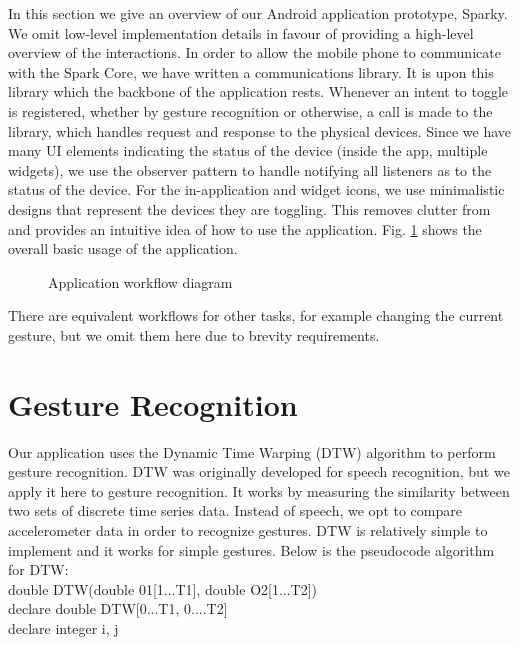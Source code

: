 \documentclass[journal]{IEEEtran}
\begin{document}
In this section we give an overview of our Android application prototype, Sparky. We omit low-level implementation details in favour of providing a high-level overview of the interactions. In order to allow the mobile phone to communicate with the Spark Core, we have written a communications library. It is upon this library which the backbone of the application rests. Whenever an intent to toggle is registered, whether by gesture recognition or otherwise, a call is made to the library, which handles request and response to the physical devices. Since we have many UI elements indicating the status of the device (inside the app, multiple widgets), we use the observer pattern to handle notifying all listeners as to the status of the device. For the in-application and widget icons, we use minimalistic designs that represent the devices they are toggling. This removes clutter from and provides an intuitive idea of how to use the application. Fig. \ref{fig1} shows the overall basic usage of the application.

\begin{figure}[!t]
\centering
\caption{Application workflow diagram}
\label{fig1}
\end{figure}



There are equivalent workflows for other tasks, for example changing the current gesture, but we omit them here due to brevity requirements. 

\section{Gesture Recognition}

Our application uses the Dynamic Time Warping (DTW) algorithm to perform gesture recognition. DTW was originally developed for speech recognition, but we apply it here to gesture recognition. It works by measuring the similarity between two sets of discrete time series data. Instead of speech, we opt to compare accelerometer data in order to recognize gestures. DTW is relatively simple to implement and it works for simple gestures. Below is the pseudocode algorithm for DTW:\\

\noindent 
	double DTW(double 01[1...T1], double O2[1...T2])\\
 	\hspace*{0.25cm}declare double DTW[0...T1, 0....T2]\\
 	\hspace*{0.25cm}declare integer i, j\\
 	
\end{document}
